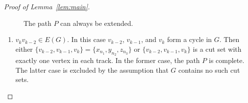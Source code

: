 \documentclass{jgaa-art}
\newcommand{\figlabel}[1]{\label{fig:#1}}
\newcommand{\lemref}[1]{Lemma~\ref{lem:#1}}
\begin{document}
\begin{proof}[Proof of \lemref{main}]
\begin{figure}
   \begin{center}
   \end{center}
   \caption{The path $P$ can always be extended.}
   \figlabel{sloppy}
\end{figure}


  \begin{enumerate}
  \item $v_k v_{k-2}\in E(G)$.  In this
  case $v_{k-2}$, $v_{k-1}$, and $v_k$ form a cycle in $G$.  Then either
  $\{v_{k-2},v_{k-1},v_{k}\}=\{x_{n_1},y_{n_2},z_{n_3}\}$ or
  $\{v_{k-2},v_{k-1},v_{k}\}$ is a cut set with exactly one vertex in
  each track.  In the former case, the path $P$ is complete. The latter case is  excluded by the assumption that $G$ contains no such cut sets.


\end{enumerate}
\end{proof}
\end{document}
